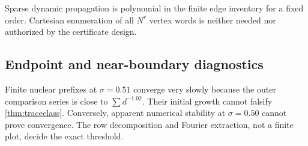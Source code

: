 Sparse dynamic propagation is polynomial in the finite edge inventory for a
fixed order.  Cartesian enumeration of all \(N^r\) vertex words is neither
needed nor authorized by the certificate design.

\subsection{Endpoint and near-boundary diagnostics}

Finite nuclear prefixes at \(\sigma=0.51\) converge very slowly because the
outer comparison series is close to \(\sum d^{-1.02}\).  Their initial
growth cannot falsify \cref{thm:traceclass}.  Conversely, apparent numerical
stability at \(\sigma=0.50\) cannot prove convergence.  The row
decomposition and Fourier extraction, not a finite plot, decide the exact
threshold.
